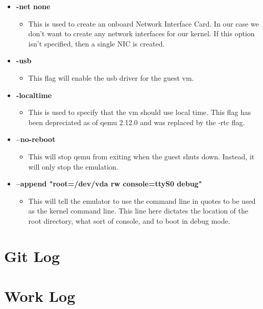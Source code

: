 \documentclass[10pt,onecolumn,draftclsnofoot]{IEEEtran} %
\begin{document}
\begin{singlespace}
\begin{itemize}
    \item \textbf{-net none}
    \begin{itemize}
      \item This is used to create an onboard Network Interface Card. In our case we don’t want to create any network interfaces for our kernel. If this option isn’t specified, then a single NIC is created.
    \end{itemize}

    \item \textbf{-usb}
    \begin{itemize}
      \item This flag will enable the usb driver for the guest vm.
    \end{itemize}

    \item \textbf{-localtime }
    \begin{itemize}
      \item This is used to specify that the vm should use local time. This flag has been depreciated as of qemu 2.12.0 and was replaced by the -rtc flag.
    \end{itemize}

    \item \textbf{--no-reboot}
    \begin{itemize}
      \item This will stop qemu from exiting when the guest shuts down. Instead, it will only stop the emulation.
    \end{itemize}

    \item \textbf{--append "root=/dev/vda rw console=ttyS0 debug"}
    \begin{itemize}
      \item This will tell the emulator to use the command line in quotes to be used as the kernel command line. This line here dictates the location of the root directory, what sort of console, and to boot in debug mode.
    \end{itemize}

  \end{itemize}


\section{\bf Git Log}
 	\begin{center}
  		
	\end{center}

\section{\bf Work Log}

\end{singlespace}
\restoregeometry
\end{document}
